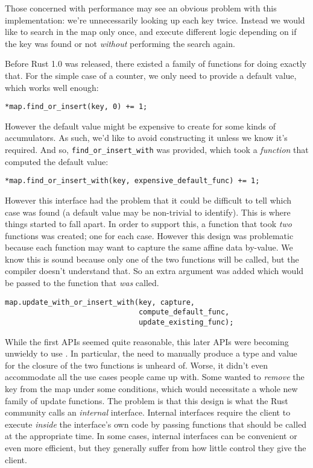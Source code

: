 Those concerned with performance may see an obvious problem with this implementation:
we're unnecessarily looking up each key twice. Instead we would like to search in the
map only once, and execute different logic depending on if the key was found or not
\emph{without} performing the search again.

Before Rust 1.0 was released, there existed a family of functions for doing exactly
that. For the simple case of a counter, we only need to provide a default value,
which works well enough:

\begin{verbatim}
*map.find_or_insert(key, 0) += 1;
\end{verbatim}

However the default value might be expensive to create for some kinds of accumulators.
As such, we'd like to avoid constructing it unless we know it's required.
And so, \texttt{find_or_insert_with} was provided, which took a
\emph{function} that computed the default value:

\begin{verbatim}
*map.find_or_insert_with(key, expensive_default_func) += 1;
\end{verbatim}

However this interface had the problem that it could be difficult to tell which
case was found (a default value may be non-trivial to identify). This is where
things started to fall apart. In order to support
this, a function that took \emph{two} functions was created; one for each case. However this
design was problematic because each function
may want to capture the same affine data by-value. We know this is sound because only
one of the two functions will be called, but the compiler doesn't understand that.
So an extra argument was added which would be passed to the function that \emph{was}
called.

\begin{verbatim}
map.update_with_or_insert_with(key, capture,
                               compute_default_func,
                               update_existing_func);
\end{verbatim}

While the first APIs seemed quite reasonable, this later APIs were becoming
unwieldy to use \cite{entry1}. In particular, the need to manually produce
a type and value for the closure of the two functions is unheard of. Worse,
it didn't even accommodate all the use cases people came up with. Some wanted
to \emph{remove} the key from the map under some conditions, which would necessitate
a whole new family of update functions. The problem is that this design is what the
Rust community calls an \emph{internal} interface. Internal interfaces require the client
to execute \emph{inside} the interface's own code by passing functions that should be
called at the appropriate time. In some cases, internal interfaces can be convenient
or even more efficient, but they generally suffer from how little control they give
the client.

